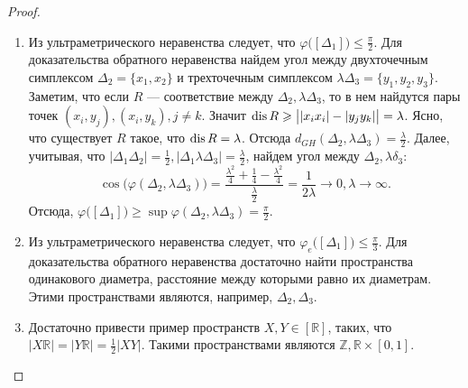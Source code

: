 \begin{proof}
\begin{enumerate}
    \item Из ультраметрического неравенства следует, что \( \varphi \big([\Delta _1]\big)\le \frac{\pi }{2} \). Для доказательства обратного неравенства найдем угол между двухточечным симплексом \( \Delta _{2} = \{x_1, x_2\} \) и трехточечным симплексом \( \lambda \Delta _3  = \{y_1,y_2, y_3\}\). Заметим, что если \( R \) --- соответствие между \( \Delta _2, \lambda \Delta _3 \), то в нем найдутся пары точек \( (x_i,y_j), (x_i,y_k), j \neq k \). Значит \( \operatorname{dis} R \geqslant \big||x_ix_i|-|y_jy_k|\big|  = \lambda \). Ясно, что существует \( R \) такое, что \( \operatorname{dis} R = \lambda  \). Отсюда \( d _{GH}(\Delta _2, \lambda \Delta _3) = \frac{\lambda }{2} \). Далее, учитывая, что \( |\Delta _1 \Delta _2|=\frac{1}{2}, |\Delta _1 \lambda \Delta _3|=\frac{\lambda }{2} \), найдем угол между \( \Delta _2, \lambda \delta _3 \):
        \[
            \cos \big(\varphi (\Delta _2 , \lambda \Delta _3)\big) =\frac{\frac{\lambda ^2}{4} + \frac{1}{4} - \frac{\lambda ^2}{4}}{\frac{\lambda }{2}} = \frac{1}{2 \lambda } \rightarrow 0, \lambda \rightarrow \infty. 
        \]
        Отсюда, \( \varphi \big([\Delta _1]\big) \ge \sup \varphi (\Delta _2, \lambda \Delta _3) = \frac \pi 2. \)
    \item Из ультраметрического неравенства следует, что \( \varphi_e \big([\Delta _1]\big)\le \frac{\pi }{3} \). Для доказательства обратного неравенства достаточно найти пространства одинакового диаметра, расстояние между которыми равно их диаметрам. Этими пространствами являются, например, \( \Delta _2, \Delta _3 \).
    \item Достаточно привести пример пространств \( X,Y\in [\mathbb{R}] \), таких, что \( |X \mathbb{R}| = |Y \mathbb{R}| = \frac 1 2 |XY|. \) Такими пространствами являются \( \mathbb{Z}, \mathbb{R}\times [0,1] \).
\end{enumerate}
    
\end{proof}
